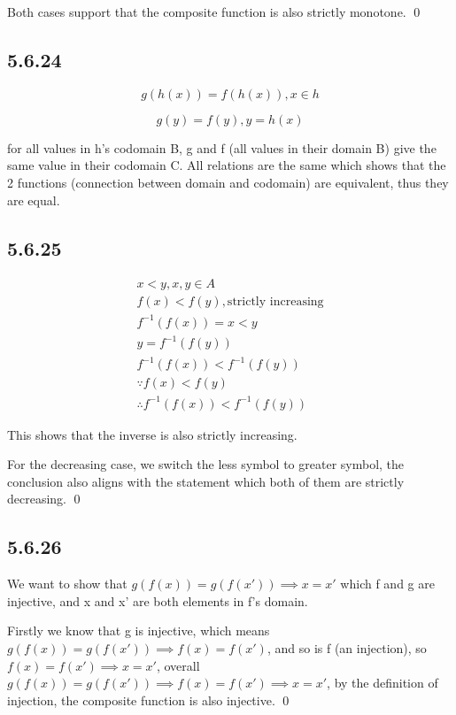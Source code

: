 \documentclass{article}
\begin{document}
Both cases support that the composite function is also strictly monotone. \qed

\subsection*{5.6.24}

$$g(h(x))=f(h(x)), x\in h$$

$$g(y)=f(y),y=h(x)$$

for all values in h's codomain B, g and f (all values in their domain B) give the same value in their codomain C. All relations are the same which shows that the 2 functions (connection between domain and codomain) are equivalent, thus they are equal. 

\subsection*{5.6.25}

\begin{gather*}
    x<y, x,y\in A\\
    f(x)<f(y), \text{strictly increasing}\\
    f^{-1}(f(x))=x < y \\
    y = f^{-1}(f(y))\\
    f^{-1}(f(x))<f^{-1}(f(y))\\
    \because f(x)<f(y)\\
    \therefore f^{-1}(f(x))<f^{-1}(f(y))
\end{gather*}

This shows that the inverse is also strictly increasing.

For the decreasing case, we switch the less symbol to greater symbol, the conclusion also aligns with the statement which both of them are strictly decreasing. \qed

\subsection*{5.6.26}

We want to show that $g(f(x))=g(f(x')) \implies x=x'$ which f and g are injective, and x and x' are both elements in f's domain.

Firstly we know that g is injective, which means $g(f(x))=g(f(x')) \implies f(x)=f(x')$, and so is f (an injection), so $f(x)=f(x')\implies x=x'$, overall $g(f(x))=g(f(x'))\implies f(x)=f(x')\implies x=x'$, by the definition of injection, the composite function is also injective. \qed
\end{document}
